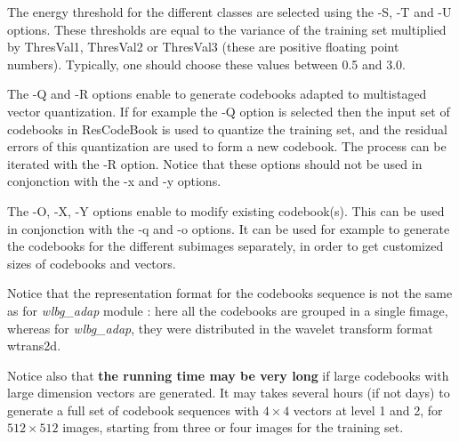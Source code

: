 The energy threshold for the different classes are selected using 
the -S, -T and -U options. These thresholds are equal to the variance 
of the training set multiplied by ThresVal1, ThresVal2 or ThresVal3 
(these are positive floating point numbers). 
Typically, one should choose these values between 0.5 and 3.0. 

The -Q and -R options enable to generate codebooks adapted to 
multistaged vector quantization. If for example the -Q option 
is selected then the input set of codebooks in ResCodeBook is used 
to quantize the training set, and the residual errors of this quantization 
are used to form a new codebook. The process can be iterated with the 
-R option. Notice that these options should not be used in conjonction with 
the -x and -y options. 

The -O, -X, -Y options enable to modify existing codebook(s). This can be used 
in conjonction with the -q and -o options. It can be used for example 
to generate the codebooks for the different subimages separately, 
in order to get customized sizes of codebooks and vectors. 

Notice that the representation format for the codebooks sequence is not the 
same as for {\em wlbg\_adap} module : here all the codebooks are grouped in 
a single fimage, whereas for {\em wlbg\_adap}, they were distributed in 
the wavelet transform format wtrans2d. 

Notice also that {\bf the running time may be very long} if large codebooks 
with large dimension vectors are generated. It may takes several hours 
(if not days) to generate a full set of codebook sequences with $4\times 4$ 
vectors at level 1 and 2, for $512\times 512$ images, starting from three 
or four images for the training set. 

